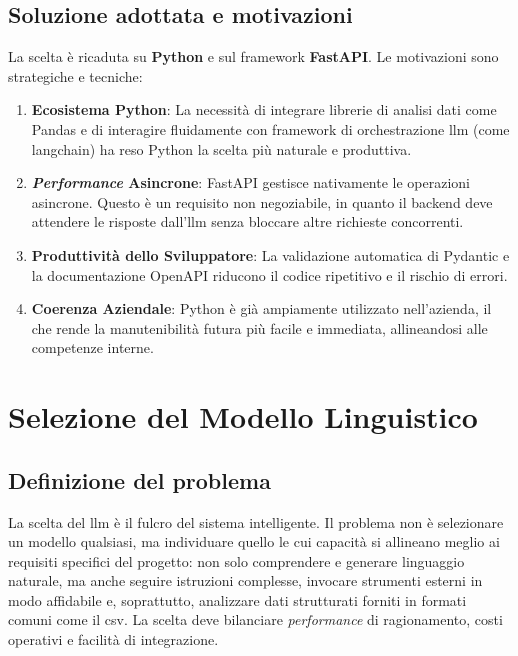 \subsection{Soluzione adottata e motivazioni}
La scelta è ricaduta su \textbf{Python} e sul \gls{framework} \textbf{FastAPI}. Le motivazioni sono strategiche e tecniche:
\begin{enumerate}
    \item \textbf{Ecosistema Python}: La necessità di integrare librerie di analisi dati come Pandas e di interagire fluidamente con \gls{framework} di orchestrazione \gls{llm} (come \gls{langchain}) ha reso Python la scelta più naturale e produttiva.
    \item \textbf{\textit{Performance} Asincrone}: FastAPI gestisce nativamente le operazioni asincrone. Questo è un requisito non negoziabile, in quanto il \gls{backend} deve attendere le risposte dall'\gls{llm} senza bloccare altre richieste concorrenti.
    \item \textbf{Produttività dello Sviluppatore}: La validazione automatica di Pydantic e la documentazione OpenAPI riducono il codice ripetitivo e il rischio di errori.
    \item \textbf{Coerenza Aziendale}: Python è già ampiamente utilizzato nell'azienda, il che rende la manutenibilità futura più facile e immediata, allineandosi alle competenze interne.
\end{enumerate}

\section{Selezione del Modello Linguistico}
\label{sec:llm_selection}

\subsection{Definizione del problema}
La scelta del \gls{llm} è il fulcro del sistema intelligente. Il problema non è selezionare un modello qualsiasi, ma individuare quello le cui capacità si allineano meglio ai requisiti specifici del progetto: non solo comprendere e generare linguaggio naturale, ma anche seguire istruzioni complesse, invocare strumenti esterni in modo affidabile e, soprattutto, analizzare dati strutturati forniti in formati comuni come il \gls{csv}. La scelta deve bilanciare \textit{performance} di ragionamento, costi operativi e facilità di integrazione.

